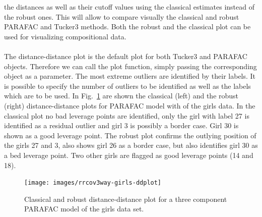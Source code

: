 \documentclass[article,shortnames, nojss]{jss}
\begin{document}
the distances as well as their cutoff values using the classical
estimates instead of the robust ones. This will allow to compare visually
the classical and robust PARAFAC and Tucker3 methods. Both the robust and
the classical plot can be used for visualizing compositional data.\\\\
The distance-distance plot is the default plot for both Tucker3 and PARAFAC objects.
Therefore we can call the plot function, simply passing the
corresponding object as a parameter. The most extreme outliers
are identified by their labels. It is possible to specify the
number of outliers to be identified as well as the labels which are to be used.
In Fig.~\ref{fig-girls-ddplot} are shown the classical (left) and the robust (right)
distance-distance plots for PARAFAC model with  of the girls data.
In the classical plot no bad leverage points are identified, only the girl
with label 27 is identified as  a residual outlier and girl 3 is possibly a border
case. Girl 30 is shown as a good leverage point. The robust  plot confirms
the outlying position of the girls 27 and 3, also shows girl 26 as a border
case, but also identifies girl 30 as a bed leverage point. Two other girls
are flagged as good leverage points (14 and 18).
\begin{figure}[H]
\centering
\texttt{[image: images/rrcov3way-girls-ddplot]}
\caption{Classical and robust distance-distance plot for a three component PARAFAC model of the girls data set.}
\label{fig-girls-ddplot}
\end{figure}
\end{document}
